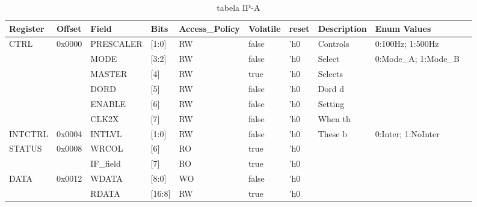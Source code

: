 \documentclass{article}
\begin{document}
\begin{table}[h]
\centering
\caption{tabela IP-A}
\label{table:IP-A}
\fontsize{7}{10}\selectfont %
\begin{tabular}{|l|l|l|l|l|l|l|l|l|l|}
\hline
\textbf{Register} & \textbf{Offset} & \textbf{Field} & \textbf{Bits} & \textbf{Access\_Policy} & \textbf{Volatile} & \textbf{reset} & \textbf{Description} & \textbf{Enum Values} \\ \hline
\multirow{6}{*}{CTRL} & \multirow{6}{*}{0x0000} & PRESCALER & [1:0]  & RW  & false & 'h0  & Controls & 0:100Hz; 1:500Hz       \\ \cline{3-9}
        &        & MODE      & [3:2]  & RW  & false & 'h0  & Select   & 0:Mode\_A; 1:Mode\_B   \\ \cline{3-9}
        &        & MASTER    & [4]    & RW  & true  & 'h0  & Selects  &                        \\ \cline{3-9}
        &        & DORD      & [5]    & RW  & false & 'h0  & Dord d   &                        \\ \cline{3-9}
        &        & ENABLE    & [6]    & RW  & false & 'h0  & Setting  &                        \\ \cline{3-9}  
        &        & CLK2X     & [7]    & RW  & false & 'h0  & When th  &                        \\ \hline  
INTCTRL & 0x0004 & INTLVL    & [1:0]  & RW  & false & 'h0  & These b  & 0:Inter; 1:NoInter     \\ \hline
\multirow{2}{*}{STATUS} & \multirow{2}{*}{0x0008} & WRCOL     & [6]    & RO  & true  & 'h0  &          &                        \\ \cline{3-9}
        &        & IF_field        & [7]    & RO  & true  & 'h0  &          &                        \\ \hline
\multirow{2}{*}{DATA} & \multirow{2}{*}{0x0012} & WDATA     & [8:0]  & WO  & false & 'h0  &          &                        \\ \cline{3-9}
        &        & RDATA     & [16:8] & RW  & true  & 'h0  &          &                        \\ \hline
\end{tabular}
\end{table}
\end{document}
